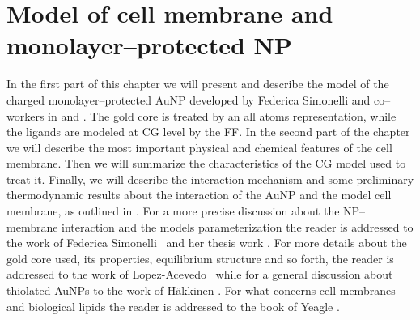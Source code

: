 \chapter{Model of cell membrane and monolayer--protected NP}
\label{chap:membraneNP}
In the first part of this chapter we will present and describe the model of the charged monolayer--protected 
\ac{AuNP} developed by Federica Simonelli and co--workers in \cite{simonelliThesis} and \cite{ourPaper}. The gold 
core is treated by an all atoms representation, while the ligands are modeled at \ac{CG} level by the \martini 
\ac{FF}. In the second part of the chapter we will describe the most important physical and chemical features of 
the cell membrane. Then we will summarize the characteristics of the \ac{CG} model used to treat it. Finally, we 
will describe the interaction mechanism and some preliminary thermodynamic results about the interaction of the 
\ac{AuNP} and the model cell membrane, as outlined in \cite{ourPaper}. For a more precise discussion about the 
\ac{NP}--membrane interaction and the models parameterization the reader is addressed to the work of Federica 
Simonelli \etal\, \cite{ourPaper} and her thesis work \cite{simonelliThesis}. For more details about the gold core used, its properties, equilibrium structure and so forth, the reader is addressed to the work of Lopez-Acevedo \etal\, \cite{clusterEquilibrium} while for a general discussion about thiolated \acp{AuNP} to the work of Häkkinen \cite{corePassivated}. For what concerns cell membranes and biological lipids the reader is addressed to the book of Yeagle \cite{yeagle}.

